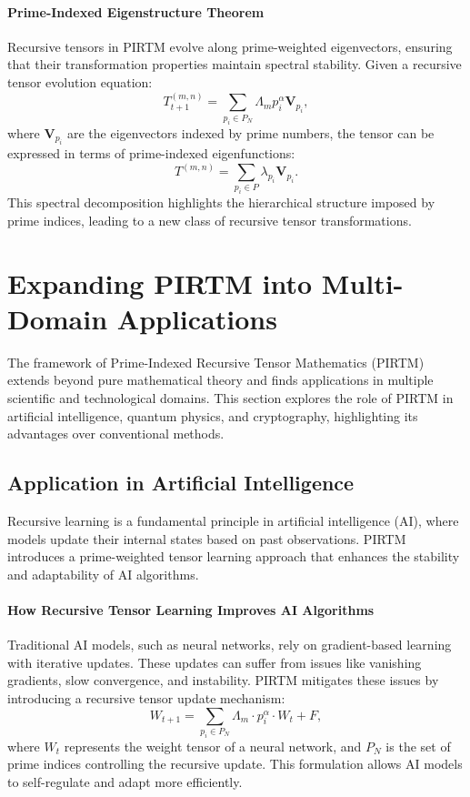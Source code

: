 \documentclass{article}
\theoremstyle{plain}
\begin{document}
\paragraph{Prime-Indexed Eigenstructure Theorem}
Recursive tensors in PIRTM evolve along prime-weighted eigenvectors, ensuring that their transformation properties maintain spectral stability. Given a recursive tensor evolution equation:
\begin{equation}
    T_{t+1}^{(m,n)} = \sum_{p_i \in P_N} \Lambda_m p_i^\alpha \mathbf{V}_{p_i},
\end{equation}
where \( \mathbf{V}_{p_i} \) are the eigenvectors indexed by prime numbers, the tensor can be expressed in terms of prime-indexed eigenfunctions:
\begin{equation}
    T^{(m,n)} = \sum_{p_i \in P} \lambda_{p_i} \mathbf{V}_{p_i}.
\end{equation}
This spectral decomposition highlights the hierarchical structure imposed by prime indices, leading to a new class of recursive tensor transformations.
\section{Expanding PIRTM into Multi-Domain Applications}

The framework of Prime-Indexed Recursive Tensor Mathematics (PIRTM) extends beyond pure mathematical theory and finds applications in multiple scientific and technological domains. This section explores the role of PIRTM in artificial intelligence, quantum physics, and cryptography, highlighting its advantages over conventional methods.

\subsection{Application in Artificial Intelligence}

Recursive learning is a fundamental principle in artificial intelligence (AI), where models update their internal states based on past observations. PIRTM introduces a prime-weighted tensor learning approach that enhances the stability and adaptability of AI algorithms.

\paragraph{How Recursive Tensor Learning Improves AI Algorithms}
Traditional AI models, such as neural networks, rely on gradient-based learning with iterative updates. These updates can suffer from issues like vanishing gradients, slow convergence, and instability. PIRTM mitigates these issues by introducing a recursive tensor update mechanism:
\begin{equation}
    W_{t+1} = \sum_{p_i \in P_N} \Lambda_m \cdot p_i^\alpha \cdot W_t + F,
\end{equation}
where \( W_t \) represents the weight tensor of a neural network, and \( P_N \) is the set of prime indices controlling the recursive update. This formulation allows AI models to self-regulate and adapt more efficiently.
\end{document}
